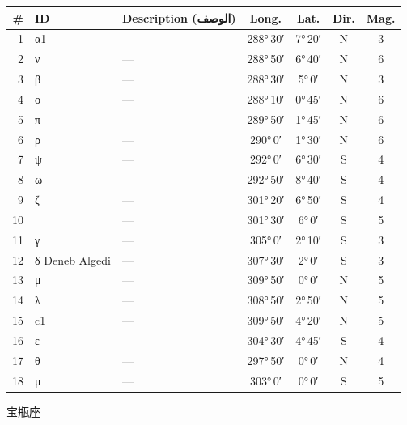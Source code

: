 \documentclass[9pt,a4paper]{extarticle}
\newcommand{\ar}[1]{{\arabicfont\textarabic{#1}}}
\begin{document}
\begin{longtable}{r l >{\raggedright\arraybackslash}p{6.7cm} c c c c}
\toprule \# & ID & Description (\ar{الوصف}) & Long. & Lat. & Dir. & Mag.\\ \midrule\endhead
1 & α1 & \textcolor{gray}{—} & 288°\,30′ & 7°\,20′ & N & 3\\
2 & ν & \textcolor{gray}{—} & 288°\,50′ & 6°\,40′ & N & 6\\
3 & β & \textcolor{gray}{—} & 288°\,30′ & 5°\,0′ & N & 3\\
4 & ο & \textcolor{gray}{—} & 288°\,10′ & 0°\,45′ & N & 6\\
5 & π & \textcolor{gray}{—} & 289°\,50′ & 1°\,45′ & N & 6\\
6 & ρ & \textcolor{gray}{—} & 290°\,0′ & 1°\,30′ & N & 6\\
7 & ψ & \textcolor{gray}{—} & 292°\,0′ & 6°\,30′ & S & 4\\
8 & ω & \textcolor{gray}{—} & 292°\,50′ & 8°\,40′ & S & 4\\
9 & ζ & \textcolor{gray}{—} & 301°\,20′ & 6°\,50′ & S & 4\\
10 &  & \textcolor{gray}{—} & 301°\,30′ & 6°\,0′ & S & 5\\
11 & γ & \textcolor{gray}{—} & 305°\,0′ & 2°\,10′ & S & 3\\
12 & δ Deneb Algedi & \textcolor{gray}{—} & 307°\,30′ & 2°\,0′ & S & 3\\
13 & μ & \textcolor{gray}{—} & 309°\,50′ & 0°\,0′ & N & 5\\
14 & λ & \textcolor{gray}{—} & 308°\,50′ & 2°\,50′ & N & 5\\
15 & c1 & \textcolor{gray}{—} & 309°\,50′ & 4°\,20′ & N & 5\\
16 & ε & \textcolor{gray}{—} & 304°\,30′ & 4°\,45′ & S & 4\\
17 & θ & \textcolor{gray}{—} & 297°\,50′ & 0°\,0′ & N & 4\\
18 & μ & \textcolor{gray}{—} & 303°\,0′ & 0°\,0′ & S & 5\\
\bottomrule\end{longtable}
\vspace{4pt}\quad\ar{الدلو}\quad 宝瓶座
\end{document}
